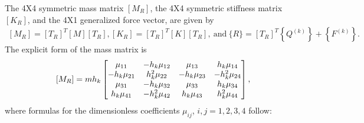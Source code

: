 \documentclass{AeroStructure-ERJohnson}
\begin{document}
The 4X4 symmetric mass matrix $\left[M_{R}\right]$, the 4X4 symmetric stiffness matrix $\left[K_{R}\right]$, and the 4X1 generalized force vector, are given by
\begin{align}\label{eq18.166}
\left[M_{R}\right]=\left[T_{R}\right]^{T}[M]\left[T_{R}\right], \left[K_{R}\right]=\left[T_{R}\right]^{T}[K]\left[T_{R}\right],\ \text{and}\ \{R\}=\left[T_{R}\right]^{T}\left\{Q^{(k)}\right\}+\left\{F^{(k)}\right\}.
\end{align}
The explicit form of the mass matrix is
\begin{align}\label{eq18.167}
\left[M_{R}\right]=m h_{k}\left[\begin{array}{@{}cccc@{}}\mu_{11} & -h_{k} \mu_{12} & \mu_{13} & h_{k} \mu_{14} \\-h_{k} \mu_{21} & h_{k}^{2} \mu_{22} & -h_{k} \mu_{23} & -h_{k}^{2} \mu_{24} \\\mu_{31} & -h_{k} \mu_{32} & \mu_{33} & h_{k} \mu_{34} \\h_{k} \mu_{41} & -h_{k}^{2} \mu_{42} & h_{k} \mu_{43} & h_{k}^{2} \mu_{44}\end{array}\right],
\end{align}
where formulas for the dimensionless coefficients $\mu_{i j}$, $i, j=1,2,3,4$ follow:
\end{document}
